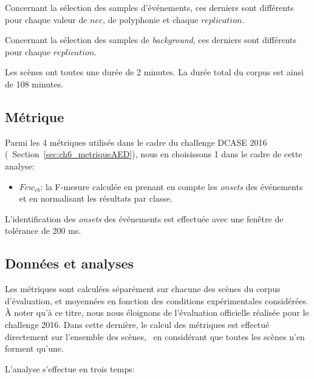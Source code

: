 Concernant la sélection des samples d'événements, ces derniers sont différents pour chaque valeur de $nec$, de polyphonie et chaque $replication$. 

Concernant la sélection des samples de \emph{background}, ces derniers sont différents pour chaque $replication$. 

Les scènes ont toutes une durée de 2 minutes. La durée total du corpus est ainsi de 108 minutes.

\subsection{Métrique}

Parmi les 4 métriques utilisés dans le cadre du challenge DCASE 2016 (\cf~Section~\ref{sec:ch6_metriqueAED}), nous en choisissons 1 dans le cadre de cette analyse:

\begin{itemize}
\item $Fcw_{eb}$: la F-mesure calculée en prenant en compte les \emph{onsets} des événements et en normalisant les résultats par classe.
\end{itemize}

L'identification des \emph{onsets} des événements est effectuée avec une fenêtre de tolérance de 200 ms.

\subsection{Données et analyses}

Les métriques sont calculées séparément sur chacune des scènes du corpus d'évaluation, et moyennées en fonction des conditions expérimentales considérées. À noter qu'à ce titre, nous nous éloignons de l'évaluation officielle réalisée pour le challenge 2016. Dans cette dernière, le calcul des métriques est effectué directement sur l'ensemble des scènes, \ie~en considérant que toutes les scènes n'en forment qu'une.

L'analyse s'effectue en trois temps:

